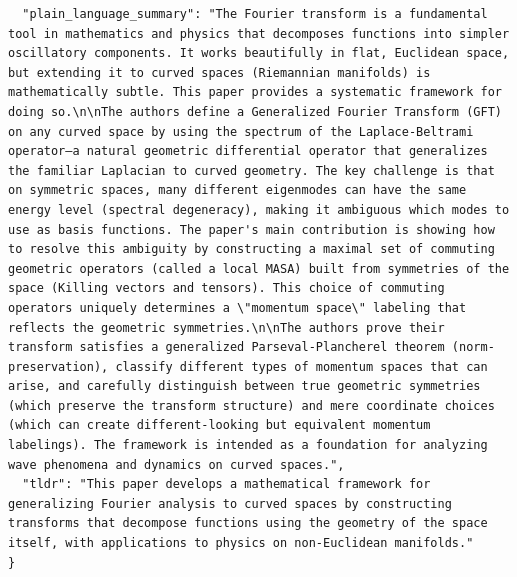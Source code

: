 \documentclass[11pt]{article}
\begin{document}
\begin{verbatim}
  "plain_language_summary": "The Fourier transform is a fundamental tool in mathematics and physics that decomposes functions into simpler oscillatory components. It works beautifully in flat, Euclidean space, but extending it to curved spaces (Riemannian manifolds) is mathematically subtle. This paper provides a systematic framework for doing so.\n\nThe authors define a Generalized Fourier Transform (GFT) on any curved space by using the spectrum of the Laplace-Beltrami operator—a natural geometric differential operator that generalizes the familiar Laplacian to curved geometry. The key challenge is that on symmetric spaces, many different eigenmodes can have the same energy level (spectral degeneracy), making it ambiguous which modes to use as basis functions. The paper's main contribution is showing how to resolve this ambiguity by constructing a maximal set of commuting geometric operators (called a local MASA) built from symmetries of the space (Killing vectors and tensors). This choice of commuting operators uniquely determines a \"momentum space\" labeling that reflects the geometric symmetries.\n\nThe authors prove their transform satisfies a generalized Parseval-Plancherel theorem (norm-preservation), classify different types of momentum spaces that can arise, and carefully distinguish between true geometric symmetries (which preserve the transform structure) and mere coordinate choices (which can create different-looking but equivalent momentum labelings). The framework is intended as a foundation for analyzing wave phenomena and dynamics on curved spaces.",
  "tldr": "This paper develops a mathematical framework for generalizing Fourier analysis to curved spaces by constructing transforms that decompose functions using the geometry of the space itself, with applications to physics on non-Euclidean manifolds."
}
\end{verbatim}
\end{document}
